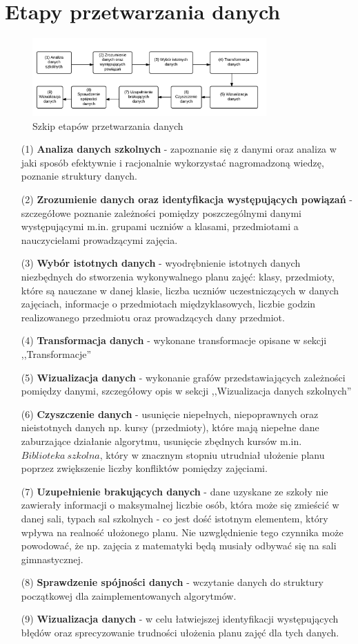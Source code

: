 \section{Etapy przetwarzania danych}
\begin{figure}[h!]
  \centering
    \includegraphics[width=0.8\textwidth]{proces_przetwarzania.png}
  \caption{Szkip etapów przetwarzania danych}
\end{figure}
\begin{enumerate}
\item[(1)] \textbf{Analiza danych szkolnych} - zapoznanie się z danymi oraz analiza w jaki sposób efektywnie i racjonalnie wykorzystać nagromadzoną wiedzę, poznanie struktury danych.
\item[(2)] \textbf{Zrozumienie danych oraz identyfikacja występujących powiązań} - szczegółowe poznanie zależności pomiędzy poszczególnymi danymi występującymi m.in. grupami uczniów a klasami, przedmiotami a nauczycielami prowadzącymi zajęcia.
\item[(3)] \textbf{Wybór istotnych danych} - wyodrębnienie istotnych danych niezbędnych do stworzenia wykonywalnego planu zajęć: klasy, przedmioty, które są nauczane w danej klasie, liczba uczniów uczestniczących w danych zajęciach, informacje o przedmiotach międzyklasowych, liczbie godzin realizowanego przedmiotu oraz prowadzących dany przedmiot.
\item[(4)] \textbf{Transformacja danych} - wykonane transformacje opisane w sekcji ,,Transformacje''
\item[(5)] \textbf{Wizualizacja danych} - wykonanie grafów przedstawiających zależności pomiędzy danymi, szczegółowy opis w sekcji ,,Wizualizacja danych szkolnych''
\item[(6)] \textbf{Czyszczenie danych}  - usunięcie niepełnych, niepoprawnych oraz nieistotnych danych np. kursy (przedmioty), które mają niepełne dane zaburzające działanie algorytmu, usunięcie zbędnych kursów m.in. $Biblioteka\ szkolna$, który w znacznym stopniu utrudniał ułożenie planu poprzez zwiększenie liczby konfliktów pomiędzy zajęciami.
\item[(7)] \textbf{Uzupełnienie brakujących danych} - dane uzyskane ze szkoły nie zawierały informacji o maksymalnej liczbie osób, która może się zmieścić w danej sali, typach sal szkolnych - co jest dość istotnym elementem, który wpływa na realność ułożonego planu. Nie uzwględnienie tego czynnika może powodować, że np. zajęcia z matematyki będą musiały odbywać się na sali gimnastycznej. 
\item[(8)] \textbf{Sprawdzenie spójności danych} - wczytanie danych do struktury początkowej dla zaimplementowanych algorytmów.
\item[(9)] \textbf{Wizualizacja danych} - w celu łatwiejszej identyfikacji występujących błędów oraz sprecyzowanie trudności ułożenia planu zajęć dla tych danych.
\end{enumerate}

